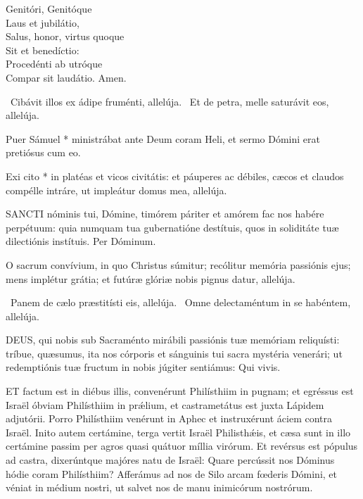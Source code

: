 Genitóri, Genitóque\\
Laus et jubilátio,\\
Salus, honor, virtus quoque\\
Sit et benedíctio:\\
Procedénti ab utróque\\
Compar sit laudátio. Amen.

\V\ Cibávit illos ex ádipe fruménti, allelúja. \R\ Et de petra, melle saturávit eos, allelúja.

 Puer Sámuel * ministrábat ante Deum coram Heli, et sermo Dómini erat pretiósus cum eo.


 Exi cito * in platéas et vicos civitátis: et páuperes ac débiles, cæcos et claudos compélle intráre, ut impleátur domus mea, allelúja.


\lettrine[lines=2]{S}{ANCTI} nóminis tui, Dómine, timórem páriter et amórem fac nos habére perpétuum: quia numquam tua gubernatióne destítuis, quos in soliditáte tuæ dilectiónis instítuis. Per Dóminum.


 O sacrum convívium, in quo Christus súmitur; recólitur memória passiónis ejus; mens implétur grátia; et futúræ glóriæ nobis pignus datur, allelúja.

\V\ Panem de cælo præstitísti eis, allelúja. \R\ Omne delectaméntum in se habéntem, allelúja.


\lettrine[lines=2]{D}{EUS}, qui nobis sub Sacraménto mirábili passiónis tuæ memóriam reliquísti: tríbue, quæsumus, ita nos córporis et sánguinis tui sacra mystéria venerári; ut redemptiónis tuæ fructum in nobis júgiter sentiámus: Qui vivis.




\lettrine[lines=2]{E}{T} factum est in diébus illis, convenérunt Philísthiim in pugnam; et egréssus est Israël óbviam Philísthiim in prǽlium, et castrametátus est juxta Lápidem adjutórii. Porro Philísthiim venérunt in Aphec et instruxérunt áciem contra Israël. Inito autem certámine, terga vertit Israël Philisthǽis, et cæsa sunt in illo certámine passim per agros quasi quátuor míllia virórum. Et revérsus est pópulus ad castra, dixerúntque majóres natu de Israël: Quare percússit nos Dóminus hódie coram Philísthiim? Afferámus ad nos de Silo arcam fœderis Dómini, et véniat in médium nostri, ut salvet nos de manu inimicórum nostrórum.

